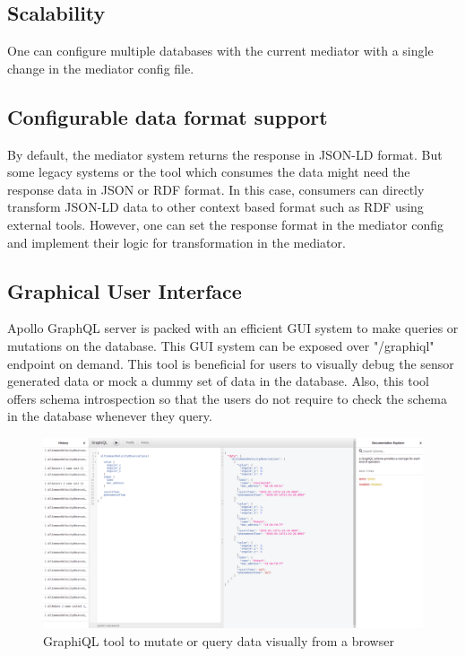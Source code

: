 \subsection{Scalability}
One can configure multiple databases with the current mediator with a single change in the mediator config file.

\subsection{Configurable data format support}
By default, the mediator system returns the response in JSON-LD format. But some legacy systems or the tool which consumes the data might need the response data in JSON or RDF format. In this case, consumers can directly transform JSON-LD data to other context based format such as RDF using external tools. However, one can set the response format in the mediator config and implement their logic for transformation in the mediator.

\subsection{Graphical User Interface}
Apollo GraphQL server is packed with an efficient GUI system to make queries or mutations on the database. This GUI system can be exposed over "/graphiql" endpoint on demand. This tool is beneficial for users to visually debug the sensor generated data or mock a dummy set of data in the database. Also, this tool offers schema introspection so that the users do not require to check the schema in the database whenever they query. 

\newpage

	\begin{figure}[H] 
		\begin{center}
			\includegraphics[scale=0.37,angle=90]{./images/png/graphiql_gui}	
			\caption{GraphiQL tool to mutate or query data visually from a browser}	
			\label{fig:graphiql_gui}	
		\end{center}
	\end{figure}
\thispagestyle{empty}

